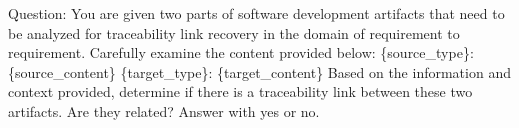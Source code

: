 Question: You are given two parts of software development artifacts that need to be analyzed for traceability link recovery in the domain of requirement to requirement. Carefully examine the content provided below:\newline
\newline
\{source\_type\}: \textquotesingle{}\textquotesingle{}\textquotesingle{}\{source\_content\}\textquotesingle{}\textquotesingle{}\textquotesingle{}\newline
\newline
\{target\_type\}: \textquotesingle{}\textquotesingle{}\textquotesingle{}\{target\_content\}\textquotesingle{}\textquotesingle{}\textquotesingle{}\newline
\newline
Based on the information and context provided, determine if there is a traceability link between these two artifacts. Are they related?\newline
\newline
Answer with \textquotesingle{}yes\textquotesingle{} or \textquotesingle{}no\textquotesingle{}.